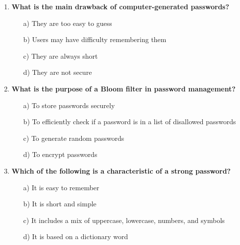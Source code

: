 \documentclass{article}
\begin{document}
\begin{enumerate}
    \item \textbf{What is the main drawback of computer-generated passwords?}
    \begin{itemize}
        \item[a)] They are too easy to guess  
        \item[b)] Users may have difficulty remembering them  
        \item[c)] They are always short  
        \item[d)] They are not secure  
    \end{itemize}
    \newpage

    \item \textbf{What is the purpose of a Bloom filter in password management?}
    \begin{itemize}
        \item[a)] To store passwords securely  
        \item[b)] To efficiently check if a password is in a list of disallowed passwords  
        \item[c)] To generate random passwords  
        \item[d)] To encrypt passwords  
    \end{itemize}

    \item \textbf{Which of the following is a characteristic of a strong password?}
    \begin{itemize}
        \item[a)] It is easy to remember  
        \item[b)] It is short and simple  
        \item[c)] It includes a mix of uppercase, lowercase, numbers, and symbols  
        \item[d)] It is based on a dictionary word  
    \end{itemize}
\end{enumerate}
\end{document}
